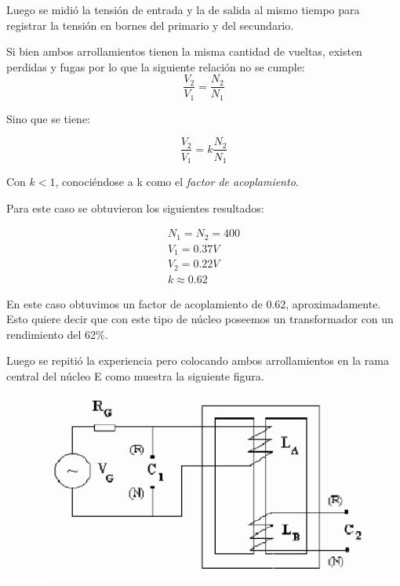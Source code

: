 \documentclass{article}
\begin{document}
Luego se midió la tensión de entrada y la de salida al mismo tiempo para registrar la tensión en bornes del primario y del secundario.

Si bien ambos arrollamientos tienen la misma cantidad de vueltas, existen perdidas y fugas por lo que la siguiente relación no se cumple:
\begin{equation}
\frac{V_{2}}{V_{1}} = \frac{N_{2}}{N_{1}}
\end{equation}

Sino que se tiene:

\begin{equation}
\frac{V_{2}}{V_{1}} = k \frac{N_{2}}{N_{1}}
\end{equation}

Con $k < 1$, conociéndose a k como el \emph{factor de acoplamiento}.

Para este caso se obtuvieron los siguientes resultados:

\begin{align*}
N_{1} = N_{2} = 400 \\
V_{1} =  0.37 V \\ 
V_{2} = 0.22 V \\
k \approx  0.62
\end{align*}

En este caso obtuvimos un factor de acoplamiento de 0.62, aproximadamente. Esto quiere decir que con este tipo de núcleo poseemos un transformador con un rendimiento del 
62\%.

Luego se repitió la experiencia pero colocando ambos arrollamientos en la rama central del núcleo E como muestra la siguiente figura.

\begin{figure}[H]
\centering
\includegraphics[width=\columnwidth]{transformador_nucleo_e}
\end{figure}
\end{document}
